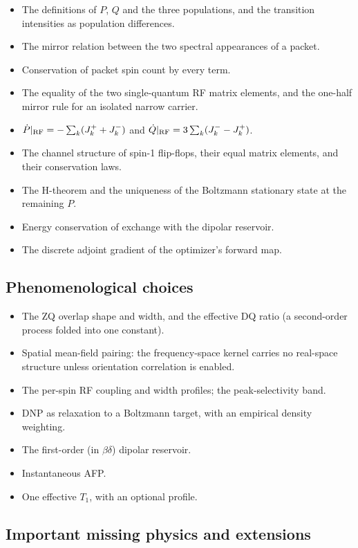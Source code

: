 \documentclass[11pt]{article}
\begin{document}
\begin{itemize}
  \item The definitions of \(P\), \(Q\) and the three populations, and the transition intensities as population differences.
  \item The mirror relation between the two spectral appearances of a packet.
  \item Conservation of packet spin count by every term.
  \item The equality of the two single-quantum RF matrix elements, and the one-half mirror rule for an isolated narrow carrier.
  \item \(\dot P|_{\rm RF}=-\sum_k(J^+_k+J^-_k)\) and \(\dot Q|_{\rm RF}=3\sum_k(J^-_k-J^+_k)\).
  \item The channel structure of spin-1 flip-flops, their equal matrix elements, and their conservation laws.
  \item The H-theorem and the uniqueness of the Boltzmann stationary state at the remaining \(P\).
  \item Energy conservation of exchange with the dipolar reservoir.
  \item The discrete adjoint gradient of the optimizer's forward map.
\end{itemize}

\subsection{Phenomenological choices}

\begin{itemize}
  \item The ZQ overlap shape and width, and the effective DQ ratio (a second-order process folded into one constant).
  \item Spatial mean-field pairing: the frequency-space kernel carries no real-space structure unless orientation correlation is enabled.
  \item The per-spin RF coupling and width profiles; the peak-selectivity band.
  \item DNP as relaxation to a Boltzmann target, with an empirical density weighting.
  \item The first-order (in \(\beta\delta\)) dipolar reservoir.
  \item Instantaneous AFP.
  \item One effective \(T_1\), with an optional profile.
\end{itemize}

\subsection{Important missing physics and extensions}
\end{document}
